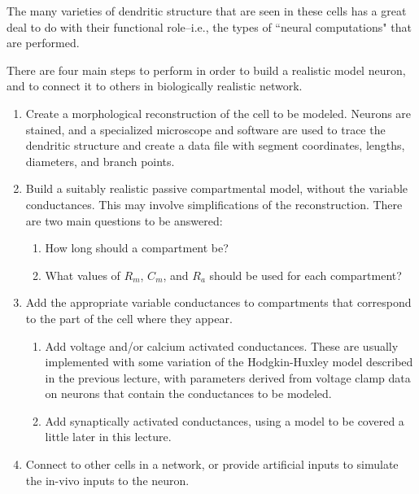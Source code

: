 \documentclass[12pt]{article}
\begin{document}
The many varieties of dendritic structure that are seen in these cells has a great deal to do with their functional role--i.e., the types of ``neural computations" that are performed.

There are four main steps to perform in order to build a realistic model neuron, and to connect it to others in biologically realistic network.

\begin{enumerate}
\item Create a morphological reconstruction of the cell to be modeled. Neurons are stained, and a specialized microscope and software are used to trace the dendritic structure and create a data file with segment coordinates, lengths, diameters, and branch points.

\item Build a suitably realistic passive compartmental model, without the variable conductances. This may involve simplifications of the reconstruction. There are two main questions to be answered:

\begin{enumerate}
\item How long should a compartment be?

\item What values of $R_m$, $C_m$, and $R_a$ should be used for each compartment? 
\end{enumerate}

\item Add the appropriate variable conductances to compartments that correspond to the part of the cell where they appear.

\begin{enumerate}
\item Add voltage and/or calcium activated conductances. These are usually implemented with some variation of the Hodgkin-Huxley model described in the previous lecture, with parameters derived from voltage clamp data on neurons that contain the conductances to be modeled.

\item Add synaptically activated conductances, using a model to be covered a little later in this lecture. 
\end{enumerate}

\item Connect to other cells in a network, or provide artificial inputs to simulate the in-vivo inputs to the neuron.
\end{enumerate}
\end{document}
